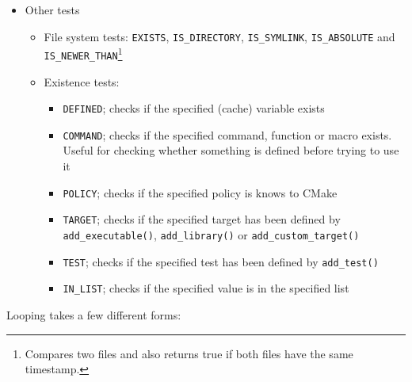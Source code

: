 \documentclass[8pt, table, xcdraw]{article}%
\begin{document}
\begin{itemize}
\begin{itemize}
\begin{itemize}
        \item Version numbers\footnote{Same robustness caveats as numeric comparisons.}: \lstinline{VERSION_LESS}, \lstinline{VERSION_GREATER}, \lstinline{VERSION_EQUAL}, \lstinline{VERSION_LESS_EQUAL} and \lstinline{VERSION_GREATER_EQUAL}
    \end{itemize}
\end{itemize}
\item Other tests
\begin{itemize}
    \item File system tests: \lstinline{EXISTS}, \lstinline{IS_DIRECTORY}, \lstinline{IS_SYMLINK}, \lstinline{IS_ABSOLUTE} and \lstinline{IS_NEWER_THAN}\footnote{Compares two files and also returns true if both files have the same timestamp.}
    \item Existence tests:
    \begin{itemize}
        \item \lstinline{DEFINED}; checks if the specified (cache) variable exists
        \item \lstinline{COMMAND}; checks if the specified command, function or macro exists. Useful for checking whether something is defined before trying to use it
        \item \lstinline{POLICY}; checks if the specified policy is knows to CMake
        \item \lstinline{TARGET}; checks if the specified target has been defined by \lstinline{add_executable()}, \lstinline{add_library()} or \lstinline{add_custom_target()}
        \item \lstinline{TEST}; checks if the specified test has been defined by \lstinline{add_test()}
        \item \lstinline{IN_LIST}; checks if the specified value is in the specified list
    \end{itemize}
\end{itemize}
\end{itemize}

Looping takes a few different forms:
\end{document}

